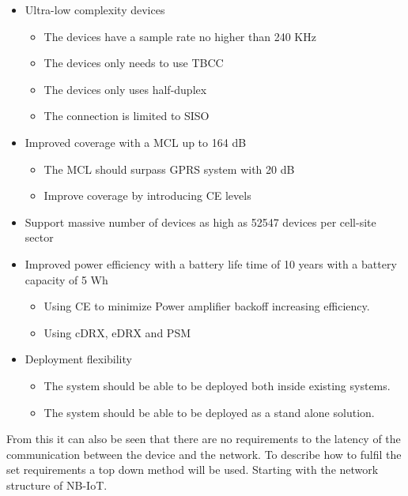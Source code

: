 \begin{itemize}
\item Ultra-low complexity devices
	\begin{itemize}
	\item The devices have a sample rate no higher than 240 KHz
	\item The devices only needs to use \gls{TBCC}
	\item The devices only uses half-duplex
	\item The connection is limited to \gls{SISO}
	\end{itemize}
\item Improved coverage with a \gls{MCL} up to 164 dB
	\begin{itemize}
	\item The \gls{MCL} should surpass \gls{GPRS} system with 20 dB
	\item Improve coverage by introducing \gls{CE} levels 
	\end{itemize}
\item Support massive number of devices as high as 52547 devices per cell-site sector
\item Improved power efficiency with a battery life time of 10 years with a battery capacity of 5 Wh
	\begin{itemize}
	\item Using \gls{CE} to minimize Power amplifier backoff increasing efficiency.
	\item Using \gls{cDRX}, \gls{eDRX} and \gls{PSM} 
	\end{itemize}
\item Deployment flexibility
	\begin{itemize}
	\item The system should be able to be deployed both inside existing systems.
	\item The system should be able to be deployed as a stand alone solution.
	\end{itemize}
\end{itemize}

From this it can also be seen that there are no requirements to the latency of the communication between the device and the network. To describe how to fulfil the set requirements a top down method will be used. Starting with the network structure of \gls{NB-IoT}.




